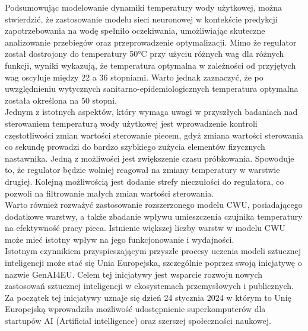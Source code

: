 \documentclass[a4paper,twoside,12pt]{book}
\begin{document}
Podsumowując modelowanie dynamiki temperatury wody użytkowej, można stwierdzić, że zastosowanie modelu sieci neuronowej w kontekście predykcji zapotrzebowania na wodę spełniło oczekiwania, umożliwiając skuteczne analizowanie przebiegów oraz przeprowadzenie optymalizacji. Mimo że regulator został dostrojony do temperatury 50°C przy użyciu różnych wag dla różnych funkcji, wyniki wykazują, że temperatura optymalna w zależności od przyjętych wag oscyluje między 22 a 36 stopniami. Warto jednak zaznaczyć, że po uwzględnieniu wytycznych sanitarno-epidemiologicznych temperatura optymalna została określona na 50 stopni.\\
Jednym z istotnych aspektów, który wymaga uwagi w przyszłych badaniach nad sterowaniem temperaturą wody użytkowej jest wprowadzenie kontroli częstotliwości zmian wartości sterowanie piecem, gdyż zmiana wartości sterowania co sekundę prowadzi do bardzo szybkiego zużycia elementów fizycznych nastawnika. Jedną z możliwości jest zwiększenie czasu próbkowania. Spowoduje to, że regulator będzie wolniej reagował na zmiany temperatury w warstwie drugiej. Kolejną możliwością jest dodanie strefy nieczułości do regulatora, co pozwoli na filtrowanie małych zmian wartości sterowania.\\
Warto również rozważyć zastosowanie rozszerzonego modelu CWU, posiadającego dodatkowe warstwy, a także zbadanie wpływu umieszczenia czujnika temperatury na efektywność pracy pieca. Istnienie większej liczby warstw w modelu CWU może mieć istotny wpływ na jego funkcjonowanie i wydajności.\\

Istotnym czynnikiem przyspieszającym przyszłe procesy uczenia modeli sztucznej inteligencji może stać się Unia Europejska, szczególnie poprzez swoją inicjatywę o nazwie GenAI4EU\cite{bib:Unia_Ai}. Celem tej inicjatywy jest wsparcie rozwoju nowych zastosowań sztucznej inteligencji w ekosystemach przemysłowych i publicznych. Za początek tej inicjatywy uznaje się dzień 24 stycznia 2024 w którym to Unię Europejską wprowadziła możliwość udostępnienie superkomputerów dla startupów AI (Artificial intelligence) oraz szerszej społeczności naukowej.


\end{document}
